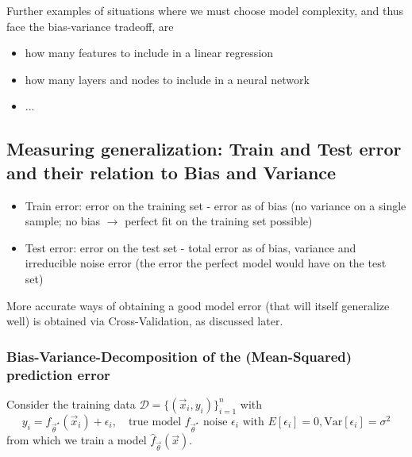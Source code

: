 Further examples of situations where we must choose model complexity, and thus face the bias-variance tradeoff,
are
\begin{itemize}
    \item how many features to include in a linear regression
    \item how many layers and nodes to include in a neural network
    \item ...
\end{itemize}


\subsection{Measuring generalization: Train and Test error and their relation to Bias and Variance}

\begin{itemize}
    \item \textcolor{blue1}{Train error}: error on the training set - error as of bias (no variance on a single sample; no bias $\rightarrow$ perfect fit on the training set possible)
    \item \textcolor{blue1}{Test error}: error on the test set - total error as of bias, variance and irreducible noise error (the error the perfect model would have on the test set)
\end{itemize}
More accurate ways of obtaining a good model error (that will itself generalize well) is obtained
via Cross-Validation, as discussed later.

\subsubsection{Bias-Variance-Decomposition of the (Mean-Squared) prediction error}
Consider the training data $\mathcal{D} = \{(\vec{x}_i, y_i)\}_{i=1}^n$ with
\begin{equation}
    y_i = f_{\vec{\theta}^\star}(\vec{x}_i) + \epsilon_i, \quad \text{true model } f_{\vec{\theta}^\star} \text{ noise } \epsilon_i \text{ with } E[\epsilon_i] = 0, \text{Var}[\epsilon_i] = \sigma^2
\end{equation}
from which we train a model $\hat{f}_{\vec{\theta}}(\vec{x})$.

